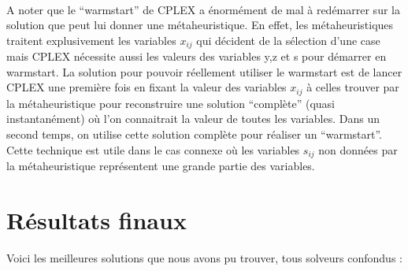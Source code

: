 \documentclass[a4paper, 11pt]{article} %
\begin{document}
\paragraph*{}
A noter que le ``warmstart'' de CPLEX a énormément de mal à redémarrer sur la solution que peut lui donner une métaheuristique. En effet, les métaheuristiques traitent explusivement les variables $x_{ij}$ qui décident de la sélection d'une case mais CPLEX nécessite aussi les valeurs des variables y,z et s pour démarrer en warmstart. La solution pour pouvoir réellement utiliser le warmstart est de lancer CPLEX une première fois en fixant la valeur des variables $x_{ij}$ à celles trouver par la métaheuristique pour reconstruire une solution ``complète'' (quasi instantanément) où l'on connaitrait la valeur de toutes les variables. Dans un second temps, on utilise cette solution complète pour réaliser un ``warmstart''. Cette technique est utile dans le cas connexe où les variables $s_{ij}$ non données par la métaheuristique représentent une grande partie des variables.




\section{Résultats finaux}
Voici les meilleures solutions que nous avons pu trouver, tous solveurs confondus :
\end{document}
